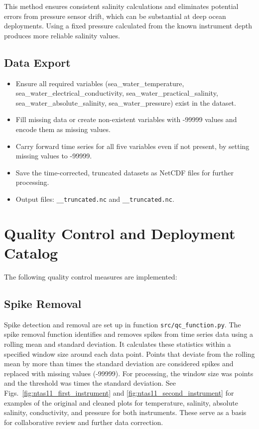 This method ensures consistent salinity calculations and eliminates potential errors from pressure sensor drift, 
which can be substantial at deep ocean deployments. 
Using a fixed pressure calculated from the known instrument depth produces more reliable salinity values.

\subsection{Data Export}

\begin{itemize}
\item Ensure all required variables (sea\_water\_temperature, sea\_water\_electrical\_conductivity, sea\_water\_practical\_salinity, sea\_water\_absolute\_salinity, sea\_water\_pressure) exist in the dataset.
\item Fill missing data or create non-existent variables with -99999 values and encode them as missing values.
\item Carry forward time series for all five variables even if not present, by setting missing values to -99999.
\item Save the time-corrected, truncated datasets as NetCDF files for further processing.
\item Output files: 
\texttt{\projectname\casenumber\_\FirstInstrument\_truncated.nc}
and \texttt{\projectname\casenumber\_\SecondInstrument\_truncated.nc}.
\end{itemize}


\section{Quality Control and Deployment Catalog}
The following quality control measures are implemented:

\subsection{Spike Removal}
Spike detection and removal are set up in function \texttt{src/qc\_function.py}. 
The spike removal function identifies and removes spikes from time series data using a rolling mean and standard deviation. 
It calculates these statistics within a specified window size around each data point. 
Points that deviate from the rolling mean by more than \ThresholdValue{} times the standard deviation are considered spikes and replaced with missing values (-99999). 
For \projectname{} \casenumber{} processing, the window size was \WindowSize{} points and the threshold was \ThresholdValue{} times the standard deviation.
See Figs.~\ref{fig:ntas11_first_instrument} and \ref{fig:ntas11_second_instrument} for examples of the original and cleaned plots for temperature, salinity, absolute salinity, conductivity, and pressure for both instruments.
These serve as a basis for collaborative review and further data correction.

